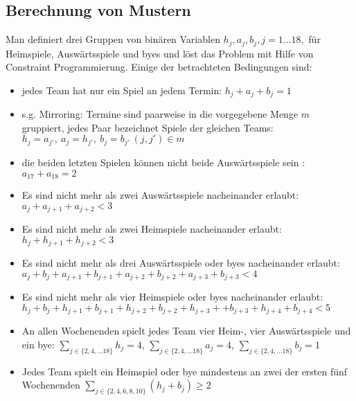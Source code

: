 \subsection{Berechnung von Mustern}
\label{Phase2}
Man definiert drei Gruppen von binären Variablen $h_j, a_j, b_j, j=1\dots 18,$ für Heimspiele, Auswärtsspiele und byes und löst das Problem mit Hilfe von Constraint Programmierung. Einige der betrachteten Bedingungen sind:
\begin{itemize}
\setlength{\itemsep}{0pt}

\item jedes Team hat nur ein Spiel an jedem Termin: $h_j+a_j+b_j = 1$

\item s.g. Mirroring: Termine sind paarweise in die vorgegebene Menge $m$ gruppiert, jedes Paar bezeichnet Spiele der gleichen Teams: $h_j=a_{j'},\ a_j=h_{j'},\ b_j=b_{j'}\ (j, j')\in m$

\item die beiden letzten Spielen können nicht beide Auswärtsspiele sein : $a_{17}+a_{18} = 2$


\item Es sind nicht mehr als zwei Auswärtsspiele nacheinander erlaubt:\\ $a_j+a_{j+1}+a_{j+2}<3$ 

\item Es sind nicht mehr als zwei Heimspiele nacheinander erlaubt:\\ $h_{j}+h_{j+1}+h_{j+2}<3$ 

\item Es sind nicht mehr als drei Auswärtsspiele oder byes  nacheinander erlaubt: \\
$a_j+b_j+a_{j+1}+b_{j+1}+a_{j+2}+b_{j+2}+a_{j+3}+b_{j+3}<4$ 

\item Es sind nicht mehr als vier Heimspiele oder byes nacheinander erlaubt:\\
$h_j+b_j+h_{j+1}+b_{j+1}+h_{j+2}+b_{j+2} +h_{j+3} ++b_{j+3} +h_{j+4}+b_{j+4} <5 $ 

\item An allen Wochenenden spielt jedes Team vier Heim-, vier Auswärtsspiele und ein bye:   $\sum_{j\in\{2,4,\dots 18\}}h_j = 4$, $\sum_{j\in\{2,4,\dots 18\}}a_j = 4$, $\sum_{j\in\{2,4,\dots 18\}}b_j = 1$

\item Jedes Team spielt ein Heimspiel oder bye mindestens an zwei der ersten fünf Wochenenden $\sum_{j\in\{2,4,6,8,10\}}(h_j+b_j) \ge 2$

\end{itemize}

